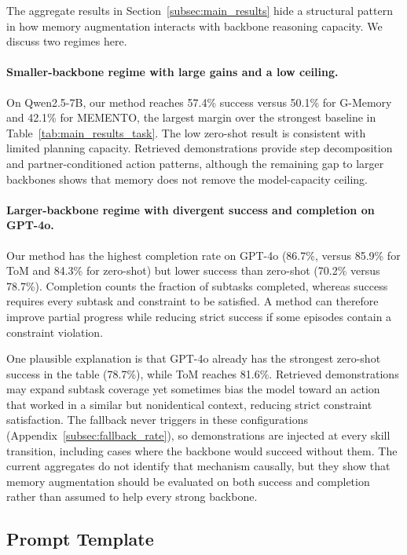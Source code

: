 \documentclass{article}
\theoremstyle{plain}
\theoremstyle{definition}
\theoremstyle{remark}
\begin{document}
The aggregate results in Section~\ref{subsec:main_results} hide a structural pattern in how memory augmentation interacts with backbone reasoning capacity. We discuss two regimes here.

\paragraph{Smaller-backbone regime with large gains and a low ceiling.} On Qwen2.5-7B, our method reaches 57.4\% success versus 50.1\% for G-Memory and 42.1\% for MEMENTO, the largest margin over the strongest baseline in Table~\ref{tab:main_results_task}. The low zero-shot result is consistent with limited planning capacity. Retrieved demonstrations provide step decomposition and partner-conditioned action patterns, although the remaining gap to larger backbones shows that memory does not remove the model-capacity ceiling.

\paragraph{Larger-backbone regime with divergent success and completion on GPT-4o.} Our method has the highest completion rate on GPT-4o (86.7\%, versus 85.9\% for ToM and 84.3\% for zero-shot) but lower success than zero-shot (70.2\% versus 78.7\%). Completion counts the fraction of subtasks completed, whereas success requires every subtask and constraint to be satisfied. A method can therefore improve partial progress while reducing strict success if some episodes contain a constraint violation.

One plausible explanation is that GPT-4o already has the strongest zero-shot success in the table (78.7\%), while ToM reaches 81.6\%. Retrieved demonstrations may expand subtask coverage yet sometimes bias the model toward an action that worked in a similar but nonidentical context, reducing strict constraint satisfaction. The fallback never triggers in these configurations (Appendix~\ref{subsec:fallback_rate}), so demonstrations are injected at every skill transition, including cases where the backbone would succeed without them. The current aggregates do not identify that mechanism causally, but they show that memory augmentation should be evaluated on both success and completion rather than assumed to help every strong backbone.


\subsection{Prompt Template}
\label{sec:prompts}
\end{document}
